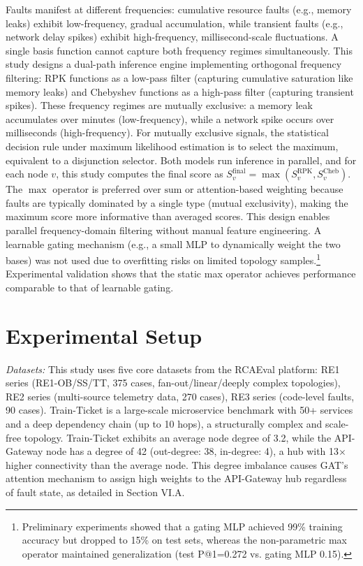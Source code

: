 \documentclass[conference]{IEEEtran}
\begin{document}
Faults manifest at different frequencies: cumulative resource faults (e.g., memory leaks) exhibit low-frequency, gradual accumulation, while transient faults (e.g., network delay spikes) exhibit high-frequency, millisecond-scale fluctuations. A single basis function cannot capture both frequency regimes simultaneously. This study designs a dual-path inference engine implementing orthogonal frequency filtering: RPK functions as a low-pass filter (capturing cumulative saturation like memory leaks) and Chebyshev functions as a high-pass filter (capturing transient spikes). These frequency regimes are mutually exclusive: a memory leak accumulates over minutes (low-frequency), while a network spike occurs over milliseconds (high-frequency). For mutually exclusive signals, the statistical decision rule under maximum likelihood estimation is to select the maximum, equivalent to a disjunction selector. Both models run inference in parallel, and for each node $v$, this study computes the final score as $S_v^{\text{final}} = \max(S_v^{\text{RPK}}, S_v^{\text{Cheb}})$. The $\max$ operator is preferred over $\text{sum}$ or attention-based weighting because faults are typically dominated by a single type (mutual exclusivity), making the maximum score more informative than averaged scores. This design enables parallel frequency-domain filtering without manual feature engineering. A learnable gating mechanism (e.g., a small MLP to dynamically weight the two bases) was not used due to overfitting risks on limited topology samples.\footnote{Preliminary experiments showed that a gating MLP achieved 99\% training accuracy but dropped to 15\% on test sets, whereas the non-parametric max operator maintained generalization (test P@1=0.272 vs. gating MLP 0.15).} Experimental validation shows that the static max operator achieves performance comparable to that of learnable gating.

\section{Experimental Setup}

\textit{Datasets:} This study uses five core datasets from the RCAEval platform: RE1 series (RE1-OB/SS/TT, 375 cases, fan-out/linear/deeply complex topologies), RE2 series (multi-source telemetry data, 270 cases), RE3 series (code-level faults, 90 cases). Train-Ticket \cite{train_ticket} is a large-scale microservice benchmark with 50+ services and a deep dependency chain (up to 10 hops), a structurally complex and scale-free topology. Train-Ticket exhibits an average node degree of 3.2, while the API-Gateway node has a degree of 42 (out-degree: 38, in-degree: 4), a hub with 13$\times$ higher connectivity than the average node. This degree imbalance causes GAT's attention mechanism to assign high weights to the API-Gateway hub regardless of fault state, as detailed in Section VI.A. 
\end{document}
